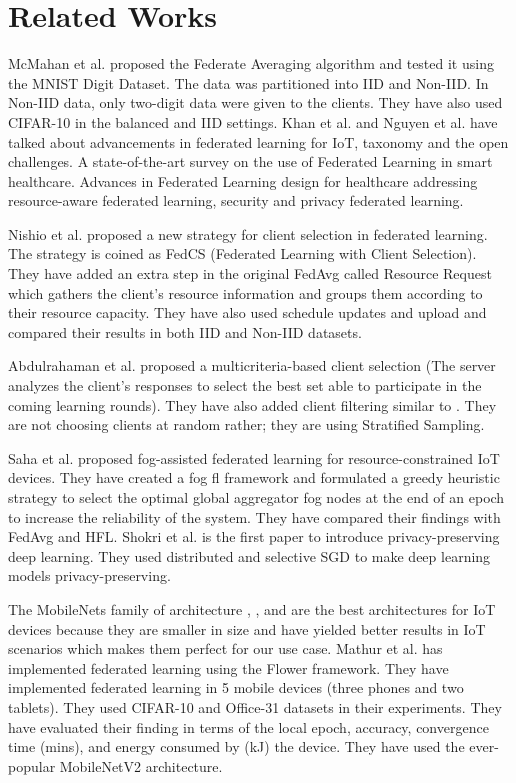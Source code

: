 \documentclass[conference]{IEEEtran}
\begin{document}
\section{Related Works}
McMahan et al. \cite{mcmahan2017communication} proposed the Federate Averaging algorithm and tested it using the MNIST Digit Dataset. The data was partitioned into IID and Non-IID. In Non-IID data, only two-digit data were given to the clients. They have also used CIFAR-10 in the balanced and IID settings. 
Khan et al. \cite{khan2021federated} and Nguyen et al. \cite{nguyen2021federated} have talked about advancements in federated learning for IoT, taxonomy and the open challenges. A state-of-the-art survey on the use of Federated Learning in smart healthcare. Advances in Federated Learning design for healthcare addressing resource-aware federated learning, security and privacy federated learning. \par
Nishio et al. \cite{nishio2019client} proposed a new strategy for client selection in federated learning. The strategy is coined as FedCS (Federated Learning with Client Selection). They have added an extra step in the original FedAvg called Resource Request which gathers the client's resource information and groups them according to their resource capacity. They have also used schedule updates and upload and compared their results in both IID and Non-IID datasets.
\par
Abdulrahaman et al. \cite{abdulrahman2020fedmccs} proposed a multicriteria-based client selection (The server analyzes the client's responses to select the best set able to participate in the coming learning rounds). They have also added client filtering similar to \cite{nishio2019client}. They are not choosing clients at random rather; they are using Stratified Sampling.
\par
Saha et al. \cite{saha2020fogfl} proposed fog-assisted federated learning for resource-constrained IoT devices. They have created a fog fl framework and formulated a greedy heuristic strategy to select the optimal global aggregator fog nodes at the end of an epoch to increase the reliability of the system. They have compared their findings with FedAvg and HFL.
Shokri et al. \cite{shokri2015privacy} is the first paper to introduce privacy-preserving deep learning. They used distributed and selective SGD to make deep learning models privacy-preserving. \par
The MobileNets family of architecture \cite{howard2017mobilenets}, \cite{sandler2018mobilenetv2}, and \cite{howard2019searching} are the best architectures for IoT devices because they are smaller in size and have yielded better results in IoT scenarios which makes them perfect for our use case. Mathur et al. \cite{mathur2021device} has implemented federated learning using the Flower framework. They have implemented federated learning in 5 mobile devices (three phones and two tablets). They used CIFAR-10 and Office-31 datasets in their experiments. They have evaluated their finding in terms of the local epoch, accuracy, convergence time (mins), and energy consumed by (kJ) the device. They have used the ever-popular MobileNetV2 \cite{sandler2018mobilenetv2} architecture. 
\end{document}
